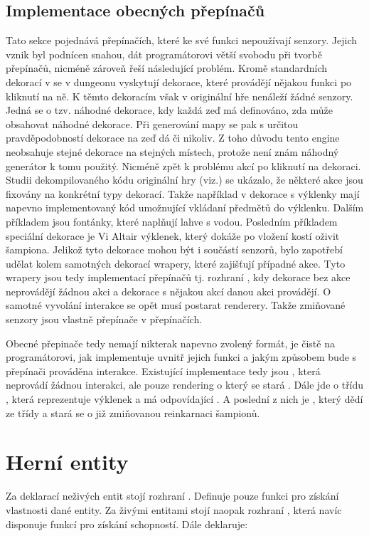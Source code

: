 \subsection{Implementace obecných přepínačů}
Tato sekce pojednává přepínačích, které ke své funkci nepoužívají senzory. Jejich vznik byl podnícen snahou, dát
programátorovi větší svobodu při tvorbě přepínačů, nicméně zároveň řeší následující problém. Kromě standardních
dekorací v se v dungeonu vyskytují dekorace, které provádějí nějakou funkci po kliknutí na ně. K těmto dekoracím však v originální
hře nenáleží žádné senzory. Jedná se o tzv. náhodné dekorace, kdy každá zeď má definováno, zda může obsahovat náhodné dekorace.
Při generování mapy se pak s určitou pravděpodobností dekorace na zeď dá či nikoliv. Z toho důvodu tento engine
neobsahuje stejné dekorace na stejných místech, protože není znám náhodný generátor k tomu použitý. Nicméně zpět 
k problému akcí po kliknutí na dekoraci. Studii dekompilovaného kódu originální hry  (viz.\cite{DMDecompilation}) se ukázalo,
že některé akce jsou fixovány na konkrétní typy dekorací. Takže například v dekorace s výklenky mají napevno implementovaný 
kód umožnující vkládaní předmětů do výklenku. Dalším příkladem jsou fontánky, které naplňují lahve s vodou. Posledním příkladem
speciální dekorace je Vi Altair výklenek, který dokáže po vložení kostí oživit šampiona. Jelikož tyto dekorace
mohou být i součástí senzorů, bylo zapotřebí udělat kolem samotných dekorací wrapery, které zajišťují případné akce.
Tyto wrapery jsou tedy implementací přepínačů tj. rozhraní , kdy dekorace bez akce neprovádějí žádnou akci a dekorace s nějakou akcí
danou akci provádějí. O samotné vyvolání interakce se opět musí postarat renderery. Takže zmiňované senzory jsou vlastně přepínače v přepínačích. 

Obecné přepinače tedy nemají nikterak napevno zvolený formát, je čistě na programátorovi, jak implementuje uvnitř jejich funkci a 
jakým způsobem bude s přepínači prováděna interakce. Existující implementace tedy jsou , která
neprovádí žádnou interakci, ale pouze rendering o který se stará . Dále jde o třídu ,
která reprezentuje výklenek a má odpovídající . A poslední z nich je , který dědí
ze třídy  a stará se o již zmiňovanou reinkarnaci šampionů.
 
\section{Herní entity}
Za deklarací neživých entit stojí rozhraní . Definuje pouze funkci pro získání vlastnosti dané entity.
Za živými entitami stojí naopak rozhraní , která navíc disponuje funkcí pro získání schopností. Dále
deklaruje:

